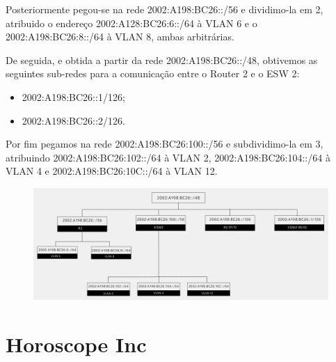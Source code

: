 \documentclass{report}
\begin{document}
Posteriormente pegou-se na rede 2002:A198:BC26::/56 e dividimo-la em 2, atribuido o endereço 2002:A128:BC26:6::/64 à VLAN 6 e o 2002:A198:BC26:8::/64 à VLAN 8, ambas arbitrárias.

De seguida, e obtida a partir da rede 2002:A198:BC26::/48, obtivemos as seguintes sub-redes para a comunicação entre o Router 2 e o ESW 2:
\begin{itemize}
    \item 2002:A198:BC26::1/126;
    \item 2002:A198:BC26::2/126.
\end{itemize}

Por fim pegamos na rede 2002:A198:BC26:100::/56 e subdividimo-la em 3, atribuindo 2002:A198:BC26:102::/64 à VLAN 2, 2002:A198:BC26:104::/64 à VLAN 4 e 2002:A198:BC26:10C::/64 à VLAN 12.

\newpage
\begin{figure}[H]
    \hspace*{-4.0cm}
    \centering
    \includegraphics[width=20cm]{code/images/ipv6_global_calendar.png}
\end{figure}

\newpage
\clearpage

\section*{Horoscope Inc}

\end{document}
